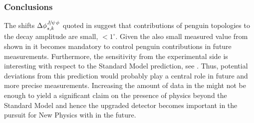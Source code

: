 \subsubsection{Conclusions}
The shifts $\Delta\phi^{{J\mskip -3mu/\mskip -2mu\psi\mskip 2mu}\phi}_{s,{k}}$ quoted in 
suggest that contributions of penguin topologies to the \BsJpsiPhi decay amplitude are
small, $<1^\circ$. Given the also small \phis measured value from \lhcb shown in 
it becomes mandatory to control penguin contributions in future \phis measurements.
Furthermore, the sensitivity from the experimental side is interesting with respect to
the Standard Model prediction, see . Thus, potential deviations from this
prediction would probably play a central role in future and more precise \phis measurements.
Increasing the amount of data in the \lhc \runtwo might not be enough to yield
a significant claim on the presence of physics beyond the Standard Model and hence
the upgraded \lhcb detector becomes important in the pursuit for New Physics with \phis in the future.
